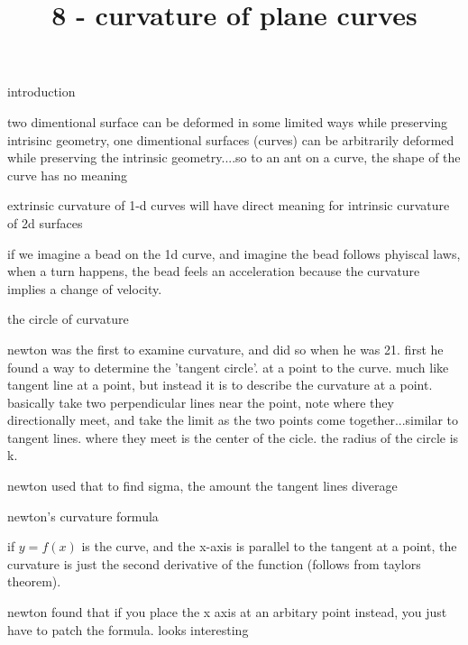 \documentclass{article}
\title{8 - curvature of plane curves}
\newenvironment{andrew_section}[1]
    {
    \section{#1}
    \begin{itemize}
    }
    {
    \end{itemize}
    }
\begin{document}
\maketitle

\begin{andrew_section}{introduction}
    \item 
        two dimentional surface can be deformed in some limited ways
        while preserving intrisinc geometry, one dimentional surfaces
        (curves) can be arbitrarily deformed while preserving the
        intrinsic geometry....so to an ant on a curve, the shape of the
        curve has no meaning
    \item 
        extrinsic curvature of 1-d curves will have direct meaning for
        intrinsic curvature of 2d surfaces
    \item 
        if we imagine a bead on the 1d curve, and imagine the bead
        follows phyiscal laws, when a turn happens, the bead feels 
        an acceleration because the curvature implies a change of
        velocity.
\end{andrew_section}

\begin{andrew_section}{the circle of curvature}
    \item 
        newton was the first to examine curvature, and did so
        when he was 21.  first he found a way to determine
        the 'tangent circle'. at a point to the curve.  much like
        tangent line at a point, but instead it is to describe the
        curvature at a point.  basically take two perpendicular lines
        near the point, note where they directionally meet, and take the
        limit as the two points come together...similar to tangent lines.
        where they meet is the center of the cicle.  the radius of the circle
        is k.
    \item 
        newton used that to find sigma, the amount the tangent lines
        diverage 
\end{andrew_section}

\begin{andrew_section}{newton's curvature formula}
    \item 
        if $y = f(x)$ is the curve, and the x-axis is parallel
        to the tangent at a point, the curvature is just the second
        derivative of the function (follows from taylors theorem).
    \item 
        newton found that if you place the x axis at an arbitary point
        instead, you just have to patch the formula.  looks interesting
\end{andrew_section}
\end{document}
